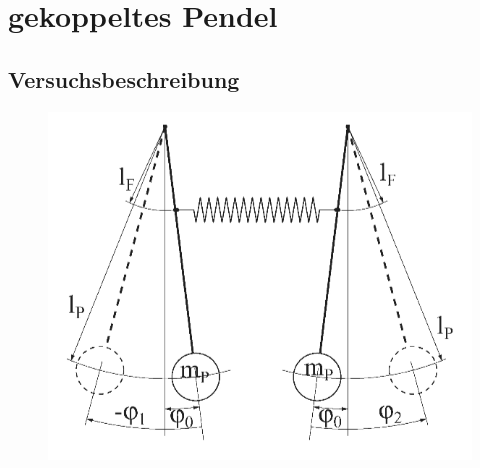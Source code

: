 \documentclass[12pt,a4paper]{article}
\author{Gruppe C14 \\ Julián Häck, Martin Koytek, Lars Wenning, Erik Zimmermann}
\begin{document}
\section{gekoppeltes Pendel}
\subsection{Versuchsbeschreibung}
\begin{figure}[H]
\centering
\includegraphics[scale=0.5]{Bilder/Gekoppeltes-Pendel.PNG}
\end{figure}
\end{document}
